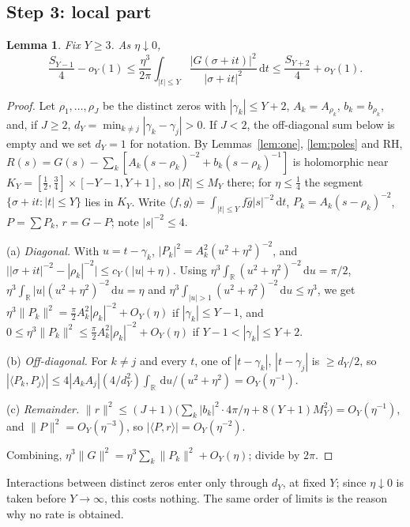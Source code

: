 \documentclass[11pt]{amsart}
\newtheorem{lemma}{Lemma}[section]
\theoremstyle{remark}
\theoremstyle{definition}
\newcommand{\dd}{\,\mathrm{d}}
\begin{document}
\subsection*{Step 3: local part}
\begin{lemma}\label{lem:loc}
Fix $Y\ge3$. As $\eta\downarrow0$,
\[
\frac{S_{Y-1}}4-o_Y(1)\le\frac{\eta^3}{2\pi}\int_{|t|\le Y}\frac{|G(\sigma+it)|^2}{|\sigma+it|^2}\dd t\le\frac{S_{Y+2}}4+o_Y(1).
\]
\end{lemma}
\begin{proof}
Let $\rho_1,\dots,\rho_J$ be the distinct zeros with $|\gamma_k|\le Y+2$, $A_k=A_{\rho_k}$, $b_k=b_{\rho_k}$, and, if $J\ge2$, $d_Y=\min_{k\ne j}|\gamma_k-\gamma_j|>0$. If $J<2$, the off-diagonal sum below is empty and we set $d_Y=1$ for notation. By Lemmas~\ref{lem:one}, \ref{lem:poles} and RH, $R(s)=G(s)-\sum_k[A_k(s-\rho_k)^{-2}+b_k(s-\rho_k)^{-1}]$ is holomorphic near $K_Y=[\frac12,\frac34]\times[-Y-1,Y+1]$, so $|R|\le M_Y$ there; for $\eta\le\frac14$ the segment $\{\sigma+it:|t|\le Y\}$ lies in $K_Y$. Write $\langle f,g\rangle=\int_{|t|\le Y}f\bar g|s|^{-2}\dd t$, $P_k=A_k(s-\rho_k)^{-2}$, $P=\sum P_k$, $r=G-P$; note $|s|^{-2}\le4$.

(a) \emph{Diagonal.} With $u=t-\gamma_k$, $|P_k|^2=A_k^2(u^2+\eta^2)^{-2}$, and $\big||\sigma+it|^{-2}-|\rho_k|^{-2}\big|\le c_Y(|u|+\eta)$. Using $\eta^3\int_{\mathbb R}(u^2+\eta^2)^{-2}\dd u=\pi/2$, $\eta^3\int_{\mathbb R}|u|(u^2+\eta^2)^{-2}\dd u=\eta$ and $\eta^3\int_{|u|>1}(u^2+\eta^2)^{-2}\dd u\le\eta^3$, we get $\eta^3\|P_k\|^2=\frac\pi2A_k^2|\rho_k|^{-2}+O_Y(\eta)$ if $|\gamma_k|\le Y-1$, and $0\le\eta^3\|P_k\|^2\le\frac\pi2A_k^2|\rho_k|^{-2}+O_Y(\eta)$ if $Y-1<|\gamma_k|\le Y+2$.

(b) \emph{Off-diagonal.} For $k\ne j$ and every $t$, one of $|t-\gamma_k|$, $|t-\gamma_j|$ is $\ge d_Y/2$, so $|\langle P_k,P_j\rangle|\le4|A_kA_j|(4/d_Y^2)\int_{\mathbb R}\dd u/(u^2+\eta^2)=O_Y(\eta^{-1})$.

(c) \emph{Remainder.} $\|r\|^2\le(J+1)\big(\sum_k|b_k|^2\cdot4\pi/\eta+8(Y+1)M_Y^2\big)=O_Y(\eta^{-1})$, and $\|P\|^2=O_Y(\eta^{-3})$, so $|\langle P,r\rangle|=O_Y(\eta^{-2})$.

Combining, $\eta^3\|G\|^2=\eta^3\sum_k\|P_k\|^2+O_Y(\eta)$; divide by $2\pi$.
\end{proof}

Interactions between distinct zeros enter only through $d_Y$, at fixed $Y$; since $\eta\downarrow0$ is taken before $Y\to\infty$, this costs nothing. The same order of limits is the reason why no rate is obtained.
\end{document}
